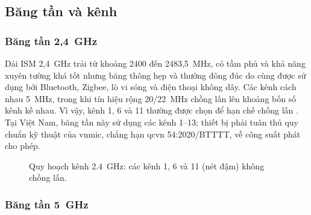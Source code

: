 \subsection{Băng tần và kênh}

\subsubsection{Băng tần 2,4~GHz}

Dải ISM 2,4~GHz trải từ khoảng 2400 đến 2483,5~MHz, có tầm phủ và khả năng
xuyên tường khá tốt nhưng băng thông hẹp và thường đông đúc do cùng được sử
dụng bởi Bluetooth, Zigbee, lò vi sóng và điện thoại không dây. Các kênh cách
nhau 5~MHz, trong khi tín hiệu rộng 20/22~MHz chồng lấn lên khoảng bốn số kênh
kề nhau. Vì vậy, kênh 1, 6 và 11 thường được chọn để hạn chế chồng lấn \cite{cisco_rf_guide}. Tại
Việt Nam, băng tần này sử dụng các kênh 1--13; thiết bị phải tuân thủ quy chuẩn
kỹ thuật của \ac{vnmic}, chẳng hạn \acs{qcvn} 54:2020/BTTTT, về công suất phát
cho phép.

\begin{figure}[htbp]
  \centering
  \caption{Quy hoạch kênh 2.4~GHz: các kênh 1, 6 và 11 (nét đậm) không chồng lấn.}
  \label{fig:ch24}
\end{figure}

\subsubsection{Băng tần 5~GHz}

